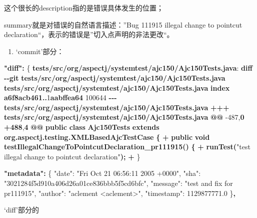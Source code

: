 \documentclass[
]{article}
\newenvironment{Shaded}{}{}
\newcommand{\DataTypeTok}[1]{\textcolor[rgb]{0.56,0.13,0.00}{#1}}
\newcommand{\DecValTok}[1]{\textcolor[rgb]{0.25,0.63,0.44}{#1}}
\newcommand{\ErrorTok}[1]{\textcolor[rgb]{1.00,0.00,0.00}{\textbf{#1}}}
\newcommand{\FloatTok}[1]{\textcolor[rgb]{0.25,0.63,0.44}{#1}}
\newcommand{\FunctionTok}[1]{\textcolor[rgb]{0.02,0.16,0.49}{#1}}
\newcommand{\StringTok}[1]{\textcolor[rgb]{0.25,0.44,0.63}{#1}}
\begin{document}
这个很长的\textquotesingle description\textquotesingle 指的是错误具体发生的位置；

\textquotesingle summary\textquotesingle 就是对错误的自然语言描述：''Bug
111915 illegal change to pointcut
declaration``，表示的错误是''切入点声明的非法更改``。

\begin{enumerate}
  \def\labelenumi{\arabic{enumi}.}
  \item
        `commit'部分：
\end{enumerate}

\begin{Shaded}
  \begin{Highlighting}[]
    \ErrorTok{"diff":} \FunctionTok{\{}
    \ErrorTok{tests/src/org/aspectj/systemtest/ajc150/Ajc150Tests.java}\FunctionTok{:}
    \ErrorTok{diff} \ErrorTok{{-}{-}git} \ErrorTok{tests/src/org/aspectj/systemtest/ajc150/Ajc150Tests.java} \ErrorTok{tests/src/org/aspectj/systemtest/ajc150/Ajc150Tests.java}
    \ErrorTok{index} \ErrorTok{a6f8acb461..}\DecValTok{1}\ErrorTok{aabffea64} \DecValTok{100644}
    \ErrorTok{{-}{-}{-}} \ErrorTok{tests/src/org/aspectj/systemtest/ajc150/Ajc150Tests.java}
    \ErrorTok{+++} \ErrorTok{tests/src/org/aspectj/systemtest/ajc150/Ajc150Tests.java}
    \ErrorTok{@@} \DecValTok{{-}487}\FunctionTok{,}\ErrorTok{0} \ErrorTok{+488}\FunctionTok{,}\ErrorTok{4} \ErrorTok{@@} \ErrorTok{public} \ErrorTok{class} \ErrorTok{Ajc150Tests} \ErrorTok{extends} \ErrorTok{org.aspectj.testing.XMLBasedAjcTestCase} \ErrorTok{\{}
    \ErrorTok{+}  \ErrorTok{public} \ErrorTok{void} \ErrorTok{testIllegalChangeToPointcutDeclaration\_pr111915()} \ErrorTok{\{}
    \ErrorTok{+}	\ErrorTok{runTest(}\DataTypeTok{"test illegal change to pointcut declaration"}\ErrorTok{);}
    \ErrorTok{+}  \FunctionTok{\}}

    \ErrorTok{"metadata":} \FunctionTok{\{}
    \DataTypeTok{"date"}\FunctionTok{:} \StringTok{"Fri Oct 21 06:56:11 2005 +0000"}\FunctionTok{,}
    \DataTypeTok{"sha"}\FunctionTok{:} \StringTok{"3021284f5d910a406d26a01ce836bbb5f5cd6bfc"}\FunctionTok{,}
    \DataTypeTok{"message"}\FunctionTok{:} \StringTok{"test and fix for pr111915"}\FunctionTok{,}
    \DataTypeTok{"author"}\FunctionTok{:} \StringTok{"aclement \textless{}aclement\textgreater{}"}\FunctionTok{,}
    \DataTypeTok{"timestamp"}\FunctionTok{:} \FloatTok{1129877771.0}
    \FunctionTok{\}}\ErrorTok{,}
  \end{Highlighting}
\end{Shaded}

`diff'部分的
\end{document}
